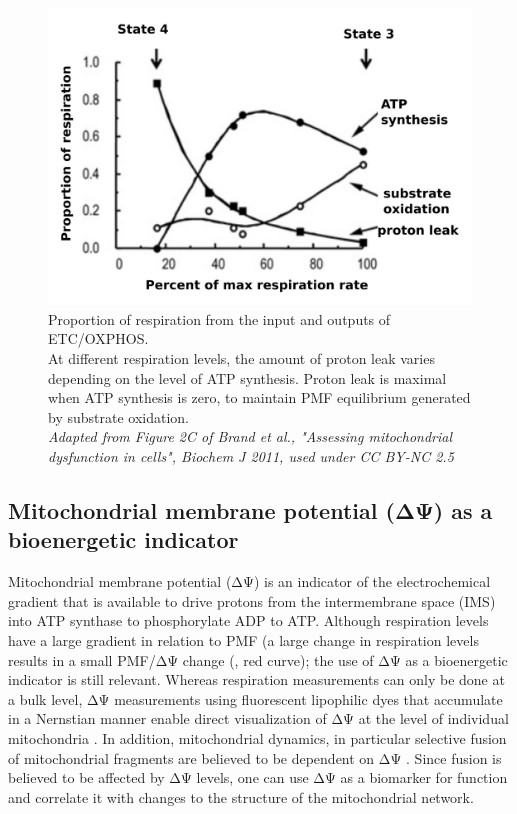 \begin{figure}[htp]
	\centering
    \includegraphics[width=.7\textwidth]{respratios}
    \caption[Proportion of respiration from the input and outputs of ETC/OXPHOS]{Proportion of respiration from the input and outputs of ETC/OXPHOS.\\At different respiration levels, the amount of proton leak varies depending on the level of ATP synthesis. Proton leak is maximal when ATP synthesis is zero, to maintain PMF equilibrium generated by substrate oxidation.\\\emph{Adapted from Figure 2C of Brand et al., "Assessing mitochondrial dysfunction in cells", Biochem J 2011, used under CC BY-NC 2.5}}\label{fig:respratios}
\end{figure}
%
\subsection{Mitochondrial membrane potential (ΔΨ) as a bioenergetic indicator}
Mitochondrial membrane potential (ΔΨ) is an indicator of the electrochemical gradient that is available to drive protons from the intermembrane space (IMS) into ATP synthase to phosphorylate ADP to ATP. Although respiration levels have a large gradient in relation to PMF (a large change in respiration levels results in a small PMF/ΔΨ change (, red curve); the use of ΔΨ as a bioenergetic indicator is still relevant. Whereas respiration measurements can only be done at a bulk level, ΔΨ measurements using fluorescent lipophilic dyes that accumulate in a Nernstian manner enable direct visualization of ΔΨ at the level of individual mitochondria \cite{twig_tagging_2006,wikstrom_-cell_2007}. In addition, mitochondrial dynamics, in particular selective fusion of mitochondrial fragments are believed to be dependent on ΔΨ \cite{twig_fission_2008}. Since fusion is believed to be affected by ΔΨ levels, one can use ΔΨ as a biomarker for function and correlate it with changes to the structure of the mitochondrial network. 

